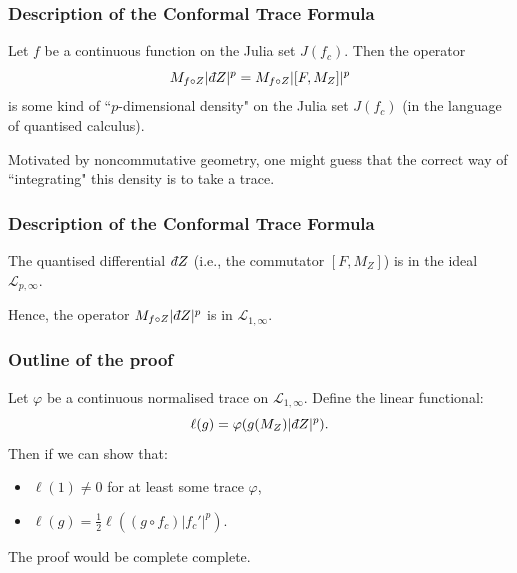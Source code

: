 \documentclass{beamer} %
\theoremstyle{definition} %
\newcommand{\Lc}{\mathcal{L}}
\def\qd{\,{\mathchar'26\mkern-12mu d}}
\begin{document}
\begin{frame}\frametitle{Description of the Conformal Trace Formula}
     Let $f$ be a continuous function on the Julia set $J(f_c)$. Then the operator
     \begin{equation*}
        M_{f\circ Z}|\qd Z|^p = M_{f\circ Z}|[F,M_Z]|^p
     \end{equation*}
     is some kind of ``$p$-dimensional density" on the Julia set $J(f_c)$ (in the language of quantised calculus).
     
     Motivated by noncommutative geometry, one might guess that the correct way of ``integrating" this density is to take a trace.
\end{frame}

\begin{frame}\frametitle{Description of the Conformal Trace Formula}
    \begin{lemma}
        The quantised differential $\qd Z$ (i.e., the commutator $[F,M_Z]$) is in the ideal $\Lc_{p,\infty}$.
    \end{lemma}
    Hence, the operator $M_{f\circ Z}|\qd Z|^p$ is in $\Lc_{1,\infty}$.
\end{frame}

\begin{frame}\frametitle{Outline of the proof}
    Let $\varphi$ be a continuous normalised trace on $\Lc_{1,\infty}$. Define the linear functional:
    \begin{equation*}
        \ell(g) = \varphi(g(M_Z)|\qd Z|^p).
    \end{equation*}
    Then if we can show that:
    \begin{itemize}
        \item{} $\ell(1) \neq 0$ for at least some trace $\varphi$,
        \item{} $\ell(g) = \frac{1}{2}\ell((g\circ f_c)|f_c'|^p)$.
    \end{itemize}
    The proof would be complete complete.
\end{frame}
\end{document}
